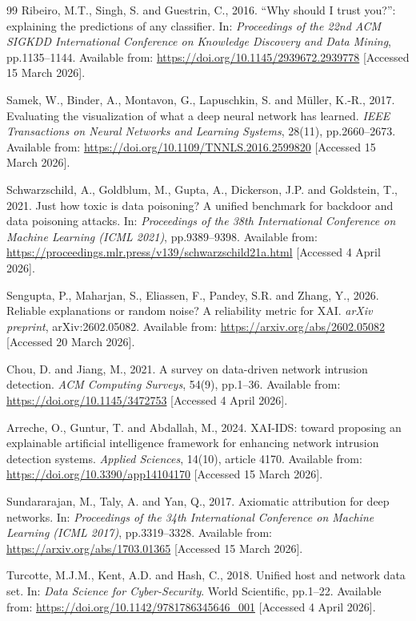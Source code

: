 \documentclass[12pt,a4paper]{report}
\begin{document}
\begin{thebibliography}{99}
Ribeiro, M.T., Singh, S. and Guestrin, C., 2016. ``Why should I trust you?'': explaining the predictions of any classifier. In: \textit{Proceedings of the 22nd ACM SIGKDD International Conference on Knowledge Discovery and Data Mining}, pp.1135--1144. Available from: \url{https://doi.org/10.1145/2939672.2939778} [Accessed 15 March 2026].

Samek, W., Binder, A., Montavon, G., Lapuschkin, S. and M\"{u}ller, K.-R., 2017. Evaluating the visualization of what a deep neural network has learned. \textit{IEEE Transactions on Neural Networks and Learning Systems}, 28(11), pp.2660--2673. Available from: \url{https://doi.org/10.1109/TNNLS.2016.2599820} [Accessed 15 March 2026].

Schwarzschild, A., Goldblum, M., Gupta, A., Dickerson, J.P. and Goldstein, T., 2021. Just how toxic is data poisoning? A unified benchmark for backdoor and data poisoning attacks. In: \textit{Proceedings of the 38th International Conference on Machine Learning (ICML 2021)}, pp.9389--9398. Available from: \url{https://proceedings.mlr.press/v139/schwarzschild21a.html} [Accessed 4 April 2026].

Sengupta, P., Maharjan, S., Eliassen, F., Pandey, S.R. and Zhang, Y., 2026. Reliable explanations or random noise? A reliability metric for XAI. \textit{arXiv preprint}, arXiv:2602.05082. Available from: \url{https://arxiv.org/abs/2602.05082} [Accessed 20 March 2026].

Chou, D. and Jiang, M., 2021. A survey on data-driven network intrusion detection. \textit{ACM Computing Surveys}, 54(9), pp.1--36. Available from: \url{https://doi.org/10.1145/3472753} [Accessed 4 April 2026].

Arreche, O., Guntur, T. and Abdallah, M., 2024. XAI-IDS: toward proposing an explainable artificial intelligence framework for enhancing network intrusion detection systems. \textit{Applied Sciences}, 14(10), article 4170. Available from: \url{https://doi.org/10.3390/app14104170} [Accessed 15 March 2026].

Sundararajan, M., Taly, A. and Yan, Q., 2017. Axiomatic attribution for deep networks. In: \textit{Proceedings of the 34th International Conference on Machine Learning (ICML 2017)}, pp.3319--3328. Available from: \url{https://arxiv.org/abs/1703.01365} [Accessed 15 March 2026].

Turcotte, M.J.M., Kent, A.D. and Hash, C., 2018. Unified host and network data set. In: \textit{Data Science for Cyber-Security}. World Scientific, pp.1--22. Available from: \url{https://doi.org/10.1142/9781786345646_001} [Accessed 4 April 2026].


\end{thebibliography}
\end{document}
